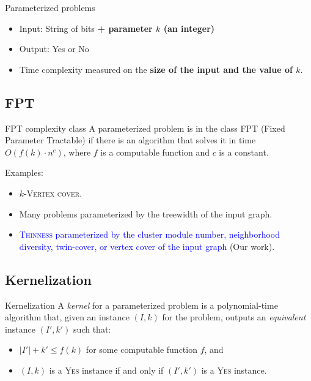 \documentclass{beamer}
\begin{document}
\begin{frame}{Parameterized problems}
    \begin{itemize}
    \item Input: String of bits \textbf{+ parameter $k$ (an integer)}
    \item Output: Yes or No
    \item Time complexity measured on the \textbf{size of the input and the value of $k$}.
    \end{itemize}
\end{frame}

\subsection{FPT}
\begin{frame}{FPT complexity class}
    A parameterized problem is in the class FPT (Fixed Parameter Tractable) if there is an algorithm that solves it in time $O(f(k) \cdot n^c)$, where $f$ is a computable function and $c$ is a constant.
    \pause

    Examples:
    \begin{itemize}
        \item<2-> $k$-\textsc{Vertex cover}.
        \item<3-> Many problems parameterized by the treewidth of the input graph.
        \item<4-> \textcolor{blue}{\textsc{Thinness} parameterized by the cluster module number, neighborhood diversity, twin-cover, or vertex cover of the input graph} (Our work).
    \end{itemize}
\end{frame}

\subsection{Kernelization}
\begin{frame}{Kernelization}
    A \emph{kernel} for a parameterized problem is a polynomial-time algorithm that, given an instance $(I,k)$ for the problem, outputs an \emph{equivalent} instance $(I',k')$ such that:
    \begin{itemize}
        \item $|I'| + k' \leq f(k)$ for some computable function $f$, and
        \item $(I,k)$ is a \textsc{Yes} instance if and only if $(I',k')$ is a \textsc{Yes} instance.
    \end{itemize}
\end{frame}
\end{document}
